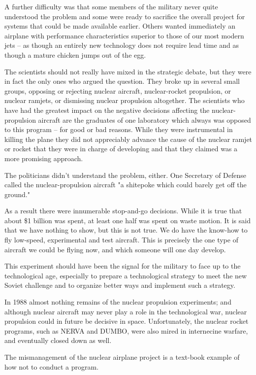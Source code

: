 A further difficulty was that some members of the military never quite understood the problem and some were ready to sacrifice the overall project for systems that could be made available earlier. Others wanted immediately an airplane with performance characteristics superior to those of our most modern jets -- as though an entirely new technology does not require lead time and as though a mature chicken jumps out of the egg.

The scientists should not really have mixed in the strategic debate, but they were in fact the only ones who argued the question. They broke up in several small groups, opposing or rejecting nuclear aircraft, nuclear-rocket propulsion, or nuclear ramjets, or dismissing nuclear propulsion altogether. The scientists who have had the greatest impact on the negative decisions affecting the nuclear-propulsion aircraft are the graduates of one laboratory which always was opposed to this program -- for good or bad reasons. While they were instrumental in killing the plane they did not appreciably advance the cause of the nuclear ramjet or rocket that they were in charge of developing and that they claimed was a more promising approach.

The politicians didn't understand the problem, either. One Secretary of Defense called the nuclear-propulsion aircraft "a shitepoke which could barely get off the ground."

As a result there were innumerable stop-and-go decisions. While it is true that about \$1 billion was spent, at least one half was spent on waste motion. It is said that we have nothing to show, but this is not true. We do have the know-how to fly low-speed, experimental and test aircraft. This is precisely the one type of aircraft we could be flying now, and which someone will one day develop.

This experiment should have been the signal for the military to face up to the technological age, especially to prepare a technological strategy to meet the new Soviet challenge and to organize better ways and implement such a strategy.

In 1988 almost nothing remains of the nuclear propulsion experiments; and although nuclear aircraft may never play a role in the technological war, nuclear propulsion could in future be decisive in space. Unfortunately, the nuclear rocket programs, such as NERVA and DUMBO, were also mired in internecine warfare, and eventually closed down as well.

The mismanagement of the nuclear airplane project is a text-book example of how not to conduct a program.

